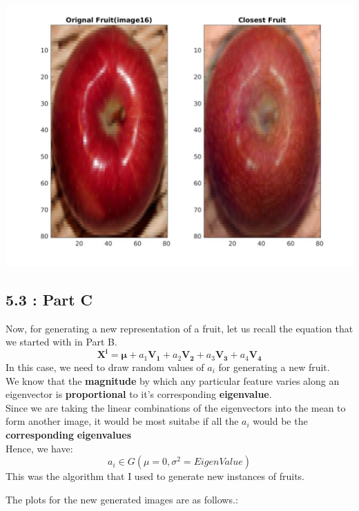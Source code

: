 \documentclass[12pt, a4paper]{article}
\begin{document}
\includegraphics[width=\textwidth, height = 0.25\paperheight]{Closest_fruit_analysis_16}


\newpage
\subsection*{5.3 : Part C}
Now, for generating a new representation of a fruit, let us recall the equation that we started with in Part B. 
$$\boldsymbol{X^i} = \boldsymbol{\mu} + a_1\boldsymbol{V_1} + a_2\boldsymbol{V_2} + a_3\boldsymbol{V_3} + a_4\boldsymbol{V_4}$$
In this case, we need to draw random values of $a_i$ for generating a new fruit. \\ 
We know that the \textbf{magnitude} by which any particular feature varies along an eigenvector is \textbf{proportional} to it's corresponding \textbf{eigenvalue}. \\ Since we are taking the linear combinations of the eigenvectors into the mean to form another image, it would be most suitabe if all the $a_i$ would be the \textbf{corresponding} \textbf{eigenvalues} \\ 
Hence, we have:
$$a_i \in G(\mu=0, \sigma^2 = EigenValue) $$
This was the algorithm that I used to generate new instances of fruits.

 \noindent The plots for the new generated images are as follows.:
 
\end{document}
